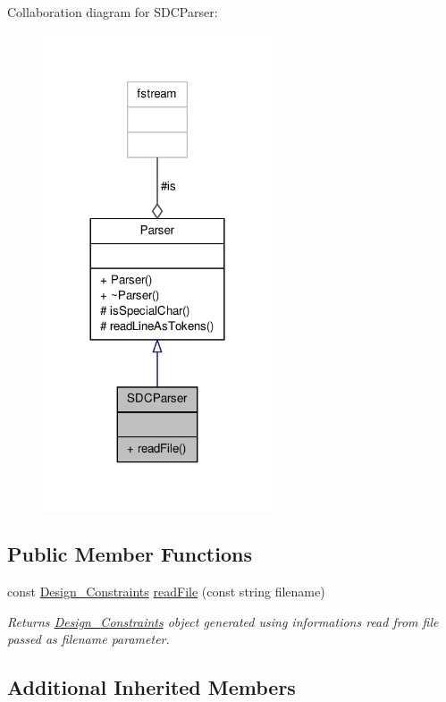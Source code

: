 Collaboration diagram for S\-D\-C\-Parser\-:\nopagebreak
\begin{figure}[H]
\begin{center}
\leavevmode
\includegraphics[width=192pt]{classSDCParser__coll__graph}
\end{center}
\end{figure}
\subsection*{Public Member Functions}
\begin{DoxyCompactItemize}
\item 
const \hyperlink{classDesign__Constraints}{Design\-\_\-\-Constraints} \hyperlink{classSDCParser_afc0ae26ac89138dd7b84e2986375785f}{read\-File} (const string filename)
\begin{DoxyCompactList}\small\item\em Returns \hyperlink{classDesign__Constraints}{Design\-\_\-\-Constraints} object generated using informations read from file passed as filename parameter. \end{DoxyCompactList}\end{DoxyCompactItemize}
\subsection*{Additional Inherited Members}


